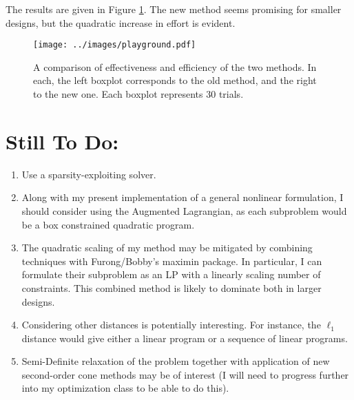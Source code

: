 \documentclass[]{article}
\begin{document}
The results are given in Figure \ref{playground}. The new method seems promising for smaller designs, but the quadratic increase in effort is evident.

\begin{figure}[h]
	\texttt{[image: ../images/playground.pdf]}
	\label{playground}
	\caption{A comparison of effectiveness and efficiency of the two methods. In each, the left boxplot corresponds to the old method, and the right to the new one. Each boxplot represents 30 trials.}
\end{figure}

\section{Still To Do:}

\begin{enumerate}
	\item Use a sparsity-exploiting solver.
	\item Along with my present implementation of a general nonlinear formulation, I should consider using the Augmented Lagrangian, as each subproblem would be a box constrained quadratic program.
	\item The quadratic scaling of my method may be mitigated by combining techniques with Furong/Bobby's maximin package. In particular, I can formulate their subproblem as an LP with a linearly scaling number of constraints. This combined method is likely to dominate both in larger designs.
	\item Considering other distances is potentially interesting. For instance, the $\ell_1$ distance would give either a linear program or a sequence of linear programs.
	\item Semi-Definite relaxation of the problem together with application of new second-order cone methods may be of interest (I will need to progress further into my optimization class to be able to do this).
\end{enumerate}
\end{document}
